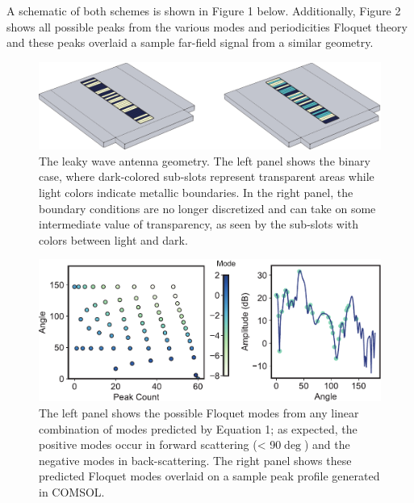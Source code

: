 \documentclass[11pt]{article}
\begin{document}
\noindent A schematic of both schemes is shown in Figure 1 below. Additionally, Figure 2 shows all possible peaks from the various modes and periodicities Floquet theory and these peaks overlaid a sample far-field signal from a similar geometry.

\begin{figure}
		\centering
		\includegraphics[width = 6in]{figures/fig5pdf}
		\caption{The leaky wave antenna geometry. The left panel shows the binary case, where dark-colored sub-slots represent transparent areas while light colors indicate metallic boundaries. In the right panel, the boundary conditions are no longer discretized and can take on some intermediate value of transparency, as seen by the sub-slots with colors between light and dark.}
\end{figure}


\begin{figure}[H]
	\centering
	\includegraphics[width=6in]{figures/fig4_labeled2pdf}
	\caption{The left panel shows the possible Floquet modes from any linear combination of modes predicted by Equation 1; as expected, the positive modes occur in forward scattering (< 90$\deg$) and the negative modes in back-scattering. The right panel shows these predicted Floquet modes overlaid on a sample peak profile generated in COMSOL.}
\end{figure}
\end{document}
